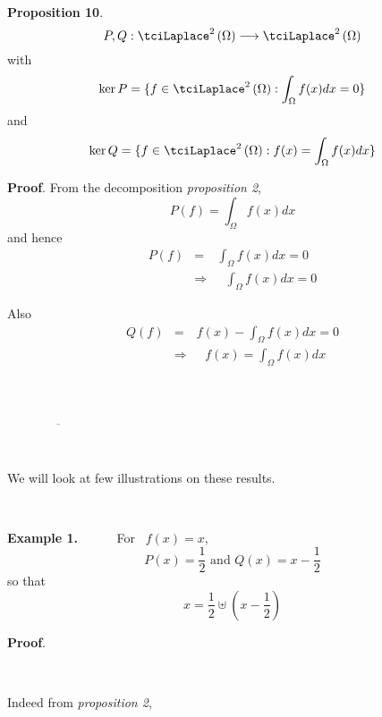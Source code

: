 \documentclass{amsproc}
\theoremstyle{plain}
\numberwithin{equation}{section}
\begin{document}
\ \ 

\textbf{Proposition 10}. 
\begin{equation*}
P,Q:\tciLaplace ^{2}\left( \Omega \right) \longrightarrow \tciLaplace
^{2}\left( \Omega \right)
\end{equation*}with 
\begin{equation*}
\ker P=\{f\in \tciLaplace ^{2}\left( \Omega \right) :\int_{\Omega }f(x)dx=0\}
\end{equation*}and 
\begin{equation*}
\ker Q=\{f\in \tciLaplace ^{2}\left( \Omega \right) :f(x)=\int_{\Omega
}f(x)dx\}
\end{equation*}

\textbf{Proof}. From the decomposition \textit{proposition 2}, 
\begin{equation*}
P(f)=\int_{\Omega }f(x)dx
\end{equation*}and hence 
\begin{eqnarray*}
P(f) &=&\int_{\Omega }f(x)dx=0 \\
&\Longrightarrow &\text{ \ }\int_{\Omega }f(x)dx=0
\end{eqnarray*}

Also\begin{eqnarray*}
Q(f) &=&f(x)-\int_{\Omega }f(x)dx=0 \\
&\Longrightarrow &\text{ \ \ }f(x)=\int_{\Omega }f(x)dx
\end{eqnarray*}

\ \ \ \ \ \ 

$\ \ \ \ \ \ \ \ \ \ \ \ \ \ \ \ \ \ \ \ \ \ \ \ \ \ \ \ \ \ \ \ \ \ \ \ \ \
\ \ \ \ \ \ \ \ \ \ \ \ $

$\overline{\ \ \ \ \ \ \ \ \ \ \ \ \ \ \ \ \ \ \ \ \ \ \ \ \ \ \ \ \ \ \ \ \
\ \ \ \ }$

\ \ 

We will look at few illustrations on these results.

\ \ \ \ 

\textbf{Example 1. \ \ \ }\ \ For \ $f\left( x\right) =x,$ 
\begin{equation*}
P(x)=\frac{1}{2}\text{ \ \ and \ \ }Q(x)=x-\frac{1}{2}
\end{equation*}
so that 
\begin{equation*}
x=\frac{1}{2}\uplus \left( x-\frac{1}{2}\right)
\end{equation*}$\ \ $

\textbf{Proof}. \ \ \ 

\ \ \ \ \ 

Indeed from \textit{proposition 2},
\end{document}
